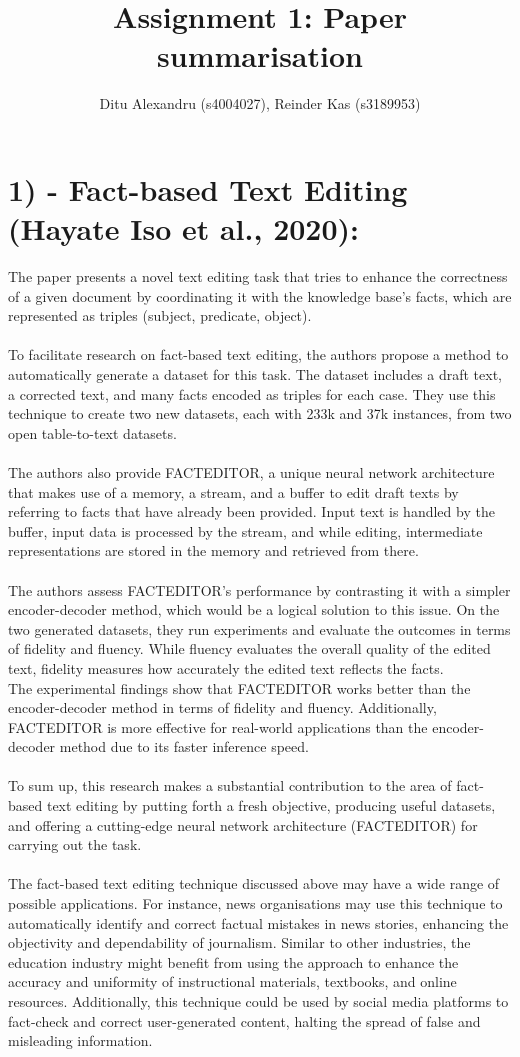 \documentclass[12pt]{article}
\title{\textbf{Assignment 1: Paper summarisation}}
\author{Ditu Alexandru (s4004027), Reinder Kas (s3189953)}
\begin{document}
\ttl

\noindent
\section*{1) - Fact-based Text Editing (Hayate Iso et al., 2020):}
The paper presents a novel text editing task that tries to enhance the correctness of a given document by coordinating it with the knowledge base's facts, which are represented as triples (subject, predicate, object). 
\\
\\
To facilitate research on fact-based text editing, the authors propose a method to automatically generate a dataset for this task. The dataset includes a draft text, a corrected text, and many facts encoded as triples for each case. They use this technique to create two new datasets, each with 233k and 37k instances, from two open table-to-text datasets. 
\\
\\
The authors also provide FACTEDITOR, a unique neural network architecture that makes use of a memory, a stream, and a buffer to edit draft texts by referring to facts that have already been provided. Input text is handled by the buffer, input data is processed by the stream, and while editing, intermediate representations are stored in the memory and retrieved from there.
\\
\\
The authors assess FACTEDITOR's performance by contrasting it with a simpler encoder-decoder method, which would be a logical solution to this issue. On the two generated datasets, they run experiments and evaluate the outcomes in terms of fidelity and fluency. While fluency evaluates the overall quality of the edited text, fidelity measures how accurately the edited text reflects the facts.
\\
The experimental findings show that FACTEDITOR works better than the encoder-decoder method in terms of fidelity and fluency. Additionally, FACTEDITOR is more effective for real-world applications than the encoder-decoder method due to its faster inference speed.
\\
\\
To sum up, this research makes a substantial contribution to the area of fact-based text editing by putting forth a fresh objective, producing useful datasets, and offering a cutting-edge neural network architecture (FACTEDITOR) for carrying out the task.
\\
\\
The fact-based text editing technique discussed above may have a wide range of possible applications. For instance, news organisations may use this technique to automatically identify and correct factual mistakes in news stories, enhancing the objectivity and dependability of journalism. Similar to other industries, the education industry might benefit from using the approach to enhance the accuracy and uniformity of instructional materials, textbooks, and online resources. Additionally, this technique could be used by social media platforms to fact-check and correct user-generated content, halting the spread of false and misleading information. 
\end{document}
